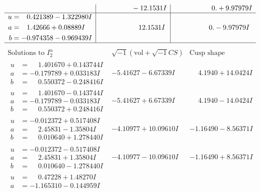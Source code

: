 \documentclass[1p]{elsarticle_modified}
\theoremstyle{definition}
\newcommand{\I}{\sqrt{-1}}
\begin{document}
$$\begin{array}{c|c|c}
 & \phantom{-0.000000 } -12.1531 I & \phantom{-0.000000 -}0. + 9.97979 I \\ \hline\begin{aligned}
u &= \phantom{-}0.421389 - 1.322980 I \\
a &= \phantom{-}1.42666 + 0.08889 I \\
b &= -0.974358 - 0.969439 I\end{aligned}
 & \phantom{-0.000000 -}12.1531 I & \phantom{-0.000000 } 0. - 9.97979 I\\
 \hline 
 \end{array}$$\newpage$$\begin{array}{c|c|c}  
\text{Solutions to }I^u_{2}& \I (\text{vol} + \sqrt{-1}CS) & \text{Cusp shape}\\
 \hline 
\begin{aligned}
u &= \phantom{-}1.401670 + 0.143744 I \\
a &= -0.179789 + 0.033183 I \\
b &= \phantom{-}0.550372 - 0.248416 I\end{aligned}
 & -5.41627 - 6.67339 I & \phantom{-}4.1940 + 14.0424 I \\ \hline\begin{aligned}
u &= \phantom{-}1.401670 - 0.143744 I \\
a &= -0.179789 - 0.033183 I \\
b &= \phantom{-}0.550372 + 0.248416 I\end{aligned}
 & -5.41627 + 6.67339 I & \phantom{-}4.1940 - 14.0424 I \\ \hline\begin{aligned}
u &= -0.012372 + 0.517408 I \\
a &= \phantom{-}2.45831 - 1.35804 I \\
b &= \phantom{-}0.010640 + 1.278440 I\end{aligned}
 & -4.10977 + 10.09610 I & -1.16490 - 8.56371 I \\ \hline\begin{aligned}
u &= -0.012372 - 0.517408 I \\
a &= \phantom{-}2.45831 + 1.35804 I \\
b &= \phantom{-}0.010640 - 1.278440 I\end{aligned}
 & -4.10977 - 10.09610 I & -1.16490 + 8.56371 I \\ \hline\begin{aligned}
u &= \phantom{-}0.47228 + 1.48270 I \\
a &= -1.165310 - 0.144959 I \\

\end{aligned}
\end{array}$$
\end{document}
